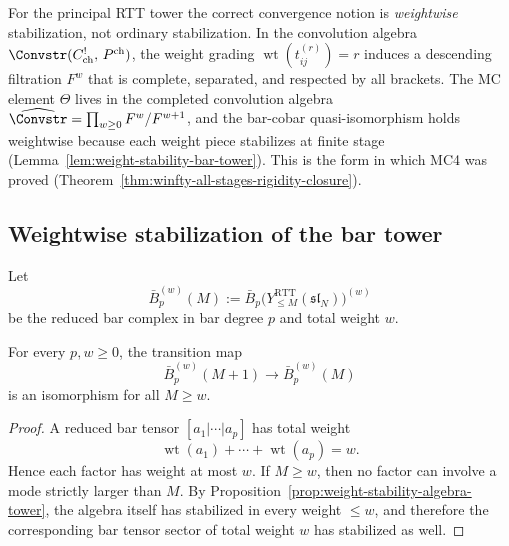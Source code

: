 \begin{remark}
\label{rem:correct-form-of-MC4}
For the principal RTT tower the correct convergence notion is
\emph{weightwise} stabilization, not ordinary stabilization.
In the convolution algebra $\Convstr(C^!_{\mathrm{ch}},\,
P^{\mathrm{ch}})$, the weight grading $\operatorname{wt}(t^{(r)}_{ij})
= r$ induces a descending filtration $F^w$ that is complete,
separated, and respected by all brackets. The MC element $\Theta$
lives in the completed convolution algebra
$\widehat{\Convstr} = \prod_{w \ge 0} F^w / F^{w+1}$, and the
bar-cobar quasi-isomorphism holds weightwise because each weight
piece stabilizes at finite stage (Lemma~\ref{lem:weight-stability-bar-tower}).
This is the form in which MC4 was proved
(Theorem~\ref{thm:winfty-all-stages-rigidity-closure}).
\end{remark}

\subsection{Weightwise stabilization of the bar tower}

Let
\begin{equation}
\bar B_p^{(w)}(M):=
\bar B_p\big(Y^{\mathrm{RTT}}_{\le M}(\mathfrak{sl}_N)\big)^{(w)}
\end{equation}
be the reduced bar complex in bar degree $p$ and total weight $w$.

\begin{lemma}
\ClaimStatusProvedHere
\label{lem:weight-stability-bar-tower}
For every $p,w\ge 0$, the transition map
\begin{equation}
\bar B_p^{(w)}(M+1)\longrightarrow \bar B_p^{(w)}(M)
\end{equation}
is an isomorphism for all $M\ge w$.
\end{lemma}

\begin{proof}
A reduced bar tensor $[a_1|\cdots|a_p]$ has total weight
\begin{equation}
\operatorname{wt}(a_1)+\cdots+\operatorname{wt}(a_p)=w.
\end{equation}
Hence each factor has weight at most $w$. If $M\ge w$, then no factor can
involve a mode strictly larger than $M$. By
Proposition~\ref{prop:weight-stability-algebra-tower}, the algebra itself
has stabilized in every weight $\le w$, and therefore the corresponding
bar tensor sector of total weight $w$ has stabilized as well.
\end{proof}

